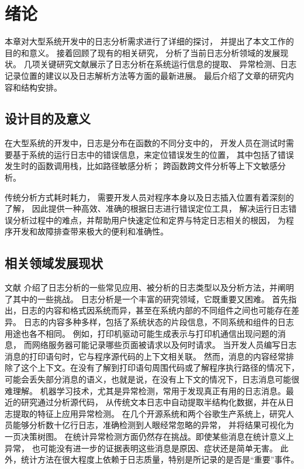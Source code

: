 
\chapter{绪论}


本章对大型系统开发中的日志分析需求进行了详细的探讨，
并提出了本文工作的目的和意义。
接着回顾了现有的相关研究，
分析了当前日志分析领域的发展现状。
几项关键研究文献展示了日志分析在系统运行信息的提取、
异常检测、日志记录位置的建议以及日志解析方法等方面的最新进展。
最后介绍了文章的研究内容和结构安排。
\section{设计目的及意义}
在大型系统的开发中，日志是分布在函数的不同分支中的，
开发人员在测试时需要基于系统的运行日志中的错误信息，来定位错误发生的位置，
其中包括了错误发生时的函数调用栈，比如路径敏感分析；
跨函数跨文件分析等上下文敏感分析。

传统分析方式耗时耗力，
需要开发人员对程序本身以及日志插入位置有着深刻的了解，
因此提供一种高效、准确的根据日志进行错误定位工具，
解决运行日志错误分析过程中的难点，并帮助用户快速定位和定界与特定日志相关的根因，
为程序开发和故障排查带来极大的便利和准确性。


\section{相关领域发展现状}
文献\cite{oliner2012advances}
介绍了日志分析的一些常见应用、被分析的日志类型以及分析方法，并阐明了其中的一些挑战。
日志分析是一个丰富的研究领域，它既重要又困难。
首先指出，日志的内容和格式因系统而异，甚至在系统内部的不同组件之间也可能存在差异。
日志的内容多种多样，包括了系统状态的片段信息，不同系统和组件的日志用途也各不相同。
例如，打印机驱动可能生成表示与打印机通信出现问题的消息，
而网络服务器可能记录哪些页面被请求以及何时请求。
当开发人员编写日志消息的打印语句时，它与程序源代码的上下文相关联。
然而，消息的内容经常排除了这个上下文。在没有了解到打印语句周围代码或了解程序执行路径的情况下，
可能会丢失部分消息的语义，也就是说，在没有上下文的情况下，日志消息可能很难理解。
机器学习技术，尤其是异常检测，常用于发现真正有用的日志消息。最近的研究通过分析源代码，
从传统文本日志中自动提取半结构化数据，并在从日志提取的特征上应用异常检测。
在几个开源系统和两个谷歌生产系统上，研究人员能够分析数十亿行日志，准确检测到人眼经常忽略的异常，
并将结果可视化为一页决策树图。
在统计异常检测方面仍然存在挑战。即使某些消息在统计意义上异常，
也可能没有进一步的证据表明这些消息是原因、症状还是简单无害。
此外，统计方法在很大程度上依赖于日志质量，特别是所记录的是否是“重要”事件。

